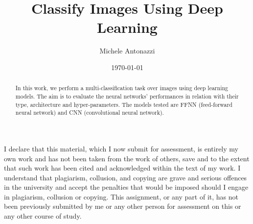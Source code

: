 \documentclass[letterpaper,12pt]{article}
\begin{document}
\title{Classify Images Using Deep Learning}
\author{Michele Antonazzi}
\date{\today}
\maketitle

\begin{abstract}
In this work, we perform a multi-classification task over images using deep learning models. The aim is to evaluate the neural networks' performances in relation with their type, architecture and hyper-parameters. The models tested are FFNN (feed-forward neural network) and CNN (convolutional neural network). 
\end{abstract}

\newpage
I declare that this material, which I now submit for assessment, is entirely my own work and has not been taken from the work of others, save and to the extent that such work has been cited and acknowledged within the text of my work. I understand that plagiarism, collusion, and copying are grave and serious offences in the university and accept the penalties that would be imposed should I engage in plagiarism, collusion or copying. This assignment, or any part of it, has not been previously submitted by me or any other person for assessment on this or any other course of study.
\newpage


\newpage

\newpage



\end{document}
